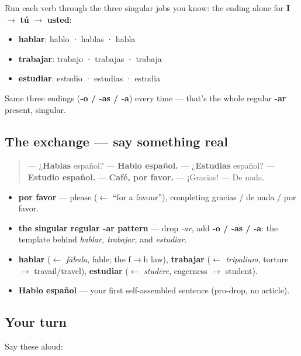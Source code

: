 \begin{grammarlens}[title={Grammar Lens: conjugate on command}]
Run each verb through the three singular jobs you know: the ending alone for \textbf{I} $\to$ \textbf{tú} $\to$ \textbf{usted}:

\begin{itemize}
\raggedright
  \item \textbf{hablar}: hablo · hablas · habla
  \item \textbf{trabajar}: trabajo · trabajas · trabaja
  \item \textbf{estudiar}: estudio · estudias · estudia
\end{itemize}

Same three endings (\textbf{-o / -as / -a}) every time — that's the whole regular \textbf{-ar} present, singular.
\end{grammarlens}

\subsection*{The exchange — say something real}
\begin{quote}
— ¿\textbf{Hablas} español? — \textbf{Hablo español.} — ¿\textbf{Estudias} español? — \textbf{Estudio español.} — \textbf{Café, por favor.} — ¡Gracias! — De nada.
\end{quote}

\begin{grammarlens}[title={What you've built this chapter}]
\begin{itemize}
\raggedright
  \item \textbf{por favor} — please ($\leftarrow$ \textquotedblleft{}for a favour\textquotedblright{}), completing gracias / de nada / por favor.
  \item \textbf{the singular regular -ar pattern} — drop \emph{-ar}, add \textbf{-o / -as / -a}: the template behind \emph{hablar, trabajar,} and \emph{estudiar}.
  \item \textbf{hablar} ($\leftarrow$ \emph{fābula}, fable; the f$\to$h law), \textbf{trabajar} ($\leftarrow$ \emph{tripalium}, torture $\to$ travail/travel), \textbf{estudiar} ($\leftarrow$ \emph{studēre}, eagerness $\to$ student).
  \item \textbf{Hablo español} — your first self-assembled sentence (pro-drop, no article).
\end{itemize}
\end{grammarlens}

\subsection*{Your turn}
Say these aloud:

